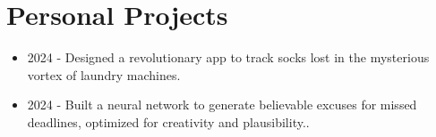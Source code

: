 \section{Personal Projects}
  \begin{itemize}[label=\textbf{$\bullet$}]
    \setlength{\itemsep}{-0.25em} %
    \setlength{\itemindent}{-0.5em} %
    \item{2024 - Designed a revolutionary app to track socks lost in the mysterious vortex of laundry machines.}
    \item{2024 - Built a neural network to generate believable excuses for missed deadlines, optimized for creativity and plausibility..}
  \end{itemize}
